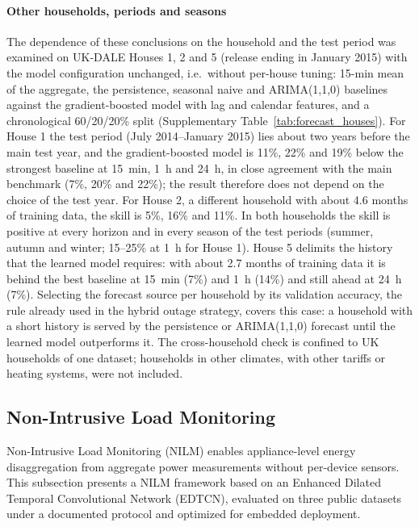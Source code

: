\documentclass[fleqn,10pt]{wlscirep}
\begin{document}
\paragraph{Other households, periods and seasons} The dependence of these conclusions on the household and the test period was examined on UK-DALE Houses 1, 2 and 5 (release ending in January 2015) with the model configuration unchanged, i.e.\ without per-house tuning: 15-min mean of the aggregate, the persistence, seasonal naive and ARIMA(1,1,0) baselines against the gradient-boosted model with lag and calendar features, and a chronological 60/20/20\% split (Supplementary Table~\ref{tab:forecast_houses}). For House 1 the test period (July 2014--January 2015) lies about two years before the main test year, and the gradient-boosted model is 11\%, 22\% and 19\% below the strongest baseline at 15~min, 1~h and 24~h, in close agreement with the main benchmark (7\%, 20\% and 22\%); the result therefore does not depend on the choice of the test year. For House 2, a different household with about 4.6 months of training data, the skill is 5\%, 16\% and 11\%. In both households the skill is positive at every horizon and in every season of the test periods (summer, autumn and winter; 15--25\% at 1~h for House 1). House 5 delimits the history that the learned model requires: with about 2.7 months of training data it is behind the best baseline at 15~min (7\%) and 1~h (14\%) and still ahead at 24~h (7\%). Selecting the forecast source per household by its validation accuracy, the rule already used in the hybrid outage strategy, covers this case: a household with a short history is served by the persistence or ARIMA(1,1,0) forecast until the learned model outperforms it. The cross-household check is confined to UK households of one dataset; households in other climates, with other tariffs or heating systems, were not included.



\subsection{Non-Intrusive Load Monitoring}
\label{subsec:nilm}

Non-Intrusive Load Monitoring (NILM) enables appliance-level energy disaggregation from aggregate power measurements without per-device sensors. This subsection presents a NILM framework based on an Enhanced Dilated Temporal Convolutional Network (EDTCN), evaluated on three public datasets under a documented protocol and optimized for embedded deployment.
\end{document}
